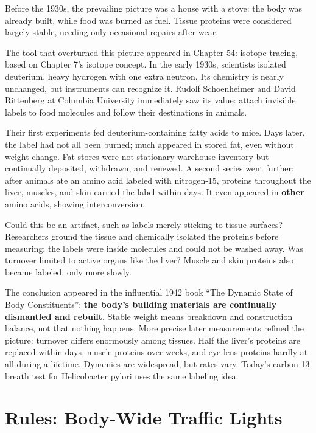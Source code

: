 \begin{zhengju}
Before the 1930s, the prevailing picture was a house with a stove: the body was already built, while food was burned as fuel. Tissue proteins were considered largely stable, needing only occasional repairs after wear.

The tool that overturned this picture appeared in Chapter 54: isotope tracing, based on Chapter 7's isotope concept. In the early 1930s, scientists isolated deuterium, heavy hydrogen with one extra neutron. Its chemistry is nearly unchanged, but instruments can recognize it. Rudolf Schoenheimer and David Rittenberg at Columbia University immediately saw its value: attach invisible labels to food molecules and follow their destinations in animals.

Their first experiments fed deuterium-containing fatty acids to mice. Days later, the label had not all been burned; much appeared in stored fat, even without weight change. Fat stores were not stationary warehouse inventory but continually deposited, withdrawn, and renewed. A second series went further: after animals ate an amino acid labeled with nitrogen-15, proteins throughout the liver, muscles, and skin carried the label within days. It even appeared in \textbf{other} amino acids, showing interconversion.

Could this be an artifact, such as labels merely sticking to tissue surfaces? Researchers ground the tissue and chemically isolated the proteins before measuring: the labels were inside molecules and could not be washed away. Was turnover limited to active organs like the liver? Muscle and skin proteins also became labeled, only more slowly.

The conclusion appeared in the influential 1942 book ``The Dynamic State of Body Constituents'': \textbf{the body's building materials are continually dismantled and rebuilt}. Stable weight means breakdown and construction balance, not that nothing happens. More precise later measurements refined the picture: turnover differs enormously among tissues. Half the liver's proteins are replaced within days, muscle proteins over weeks, and eye-lens proteins hardly at all during a lifetime. Dynamics are widespread, but rates vary. Today's carbon-13 breath test for Helicobacter pylori uses the same labeling idea.
\end{zhengju}

\section{Rules: Body-Wide Traffic Lights}

